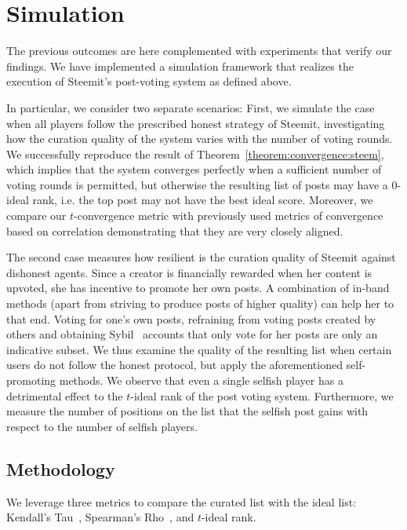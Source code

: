 \section{Simulation}
    The previous outcomes are here complemented with experiments that verify our
    findings. We have implemented a simulation framework that realizes the
    execution of Steemit's post-voting system as defined above.

    In particular, we consider two separate scenarios: First, we simulate the
    case when all players follow the prescribed honest strategy of Steemit,
    investigating how the curation quality of the system varies with the number
    of voting rounds. We successfully reproduce the result of
    Theorem~\ref{theorem:convergence:steem}, which implies that the system
    converges perfectly when a sufficient number of voting rounds is permitted,
    but otherwise the resulting list of posts may have a 0-ideal rank, i.e. the
    top post may not have the best ideal score. Moreover, we compare our
    $t$-convergence metric with previously used metrics of convergence based on
    correlation demonstrating that they are very closely aligned.

    The second case measures how resilient is the curation quality of Steemit
    against dishonest agents. Since a creator is financially rewarded when her
    content is upvoted, she has incentive to promote her own posts. A
    combination of in-band methods (apart from striving to produce posts of
    higher quality) can help her to that end. Voting for one's own posts,
    refraining from voting posts created by others and obtaining
    Sybil~\cite{sybilattack} accounts that only vote for her posts are only an
    indicative subset. We thus examine the quality of the resulting list when
    certain users do not follow the honest protocol, but apply the
    aforementioned self-promoting methods. We observe that even a single selfish
    player has a detrimental effect to the $t$-ideal rank of the post voting
    system. Furthermore, we measure the number of positions on the list that the
    selfish post gains with respect to the number of selfish players.

  \subsection{Methodology}
    We leverage three metrics to compare the curated list with the ideal list:
    Kendall's Tau~\cite{kendall1955rank}, Spearman's
    Rho~\cite{spearman1904proof}, and $t$-ideal rank.

